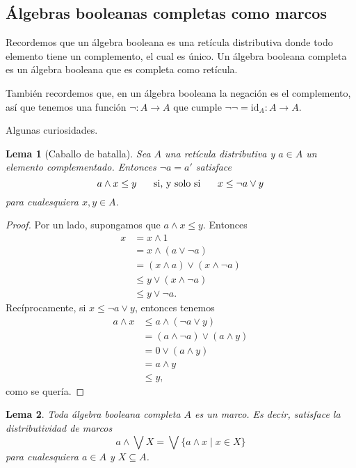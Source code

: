 \documentclass[12pt,letterpaper,titlepage]{article}
\newtheorem{lemma}{Lema}
\theoremstyle{definition}
\renewcommand\sup{\vee}
\newcommand\Sup{\bigvee}
\renewcommand\inf{\wedge}
\newcommand\ssi{\hspace{5mm}\text{ si, y solo si }\hspace{5mm}}
\newcommand\<{\langle}
\renewcommand\>{\rangle}
\newcommand{\id}{\mathrm{id}}
\begin{document}
\subsection{Álgebras booleanas completas como marcos}
Recordemos que un álgebra booleana es una retícula distributiva donde
todo elemento tiene un complemento, el cual es único.
Un álgebra booleana completa es un álgebra booleana que es
completa como retícula.

También recordemos que, en un álgebra booleana la negación
es el complemento, así que tenemos una función $\neg:A\to A$
que cumple $\neg\neg=\id_A:A\to A$.

Algunas curiosidades.
\begin{lemma}[Caballo de batalla]
    Sea $A$ una retícula distributiva
    y $a\in A$ un elemento complementado.
    Entonces $\neg a = a'$ satisface
    \[
        a\inf x \leq y  \ssi x\leq \neg a\sup y
    \]
    para cualesquiera $x,y\in A$.
\end{lemma}
\begin{proof}
    Por un lado, supongamos que $a\inf x\leq y$.
    Entonces
    \begin{align*}
        x
        &= x \inf 1 \\
        &= x \inf (a\sup \neg a) \\
        &= (x\inf a)\sup(x\inf\neg a) \\
        &\leq y \sup (x\inf \neg a) \\
        &\leq y \sup \neg a.
    \end{align*}
    Recíprocamente, si $x\leq \neg a\sup y$, entonces tenemos
    \begin{align*}
        a\inf x
        &\leq a\inf(\neg a\sup y) \\
        &= (a\inf\neg a) \sup (a\inf y) \\
        &= 0\sup (a\inf y) \\
        &= a\inf y \\
        &\leq y,
    \end{align*}
    como se quería.
\end{proof}
\begin{lemma}
    Toda álgebra booleana completa $A$ es un marco.
    Es decir, satisface la distributividad de marcos
    \[
        a\inf\Sup X = \Sup\{a\inf x\mid x\in X\}
    \]
    para cualesquiera $a\in A$ y $X\subseteq A$.
\end{lemma}
\end{document}

